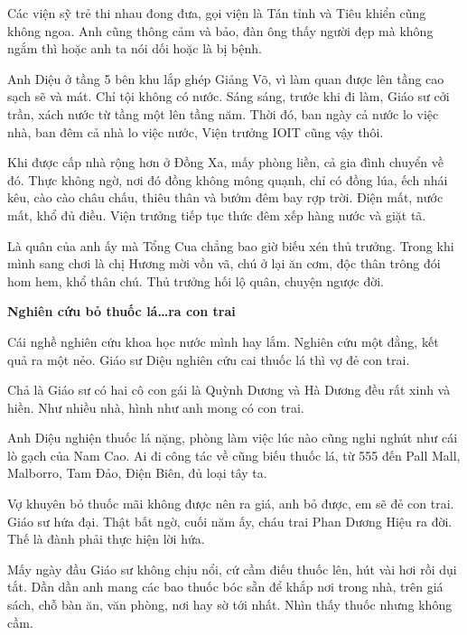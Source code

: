 Các viện sỹ trẻ thi nhau đong đưa, gọi viện là Tán tỉnh và Tiêu khiển cũng không ngoa. Anh cũng thông cảm và bảo, đàn ông thấy người đẹp mà không ngắm thì hoặc anh ta nói dối hoặc là bị bệnh.

Anh Diệu ở tầng 5 bên khu lắp ghép Giảng Võ, vì làm quan được lên tầng cao sạch sẽ và mát. Chỉ tội không có nước. Sáng sáng, trước khi đi làm, Giáo sư cởi trần, xách nước từ tầng một lên tầng năm. Thời đó, ban ngày cả nước lo việc nhà, ban đêm cả nhà lo việc nước, Viện trưởng IOIT cũng vậy thôi.

Khi được cấp nhà rộng hơn ở Đồng Xa, mấy phòng liền, cả gia đình chuyển về đó. Thực không ngờ, nơi đó đồng không mông quạnh, chỉ có đồng lúa, ếch nhái kêu, cào cào châu chấu, thiêu thân và bướm đêm bay rợp trời. Điện mất, nước mất, khổ đủ điều. Viện trưởng tiếp tục thức đêm xếp hàng nước và giặt tã.

Là quân của anh ấy mà Tổng Cua chẳng bao giờ biếu xén thủ trưởng. Trong khi mình sang chơi là chị Hương mời vồn vã, chú ở lại ăn cơm, độc thân trông đói hom hem, khổ thân chú. Thủ trưởng hối lộ quân, chuyện ngược đời.

\begin{center}
\textbf{Nghiên cứu bỏ thuốc lá…ra con trai}
\end{center}

Cái nghề nghiên cứu khoa học nước mình hay lắm. Nghiên cứu một đằng, kết quả ra một nẻo. Giáo sư Diệu nghiên cứu cai thuốc lá thì vợ đẻ con trai.

Chả là Giáo sư có hai cô con gái là Quỳnh Dương và Hà Dương đều rất xinh và hiền. Như nhiều nhà, hình như anh mong có con trai.


Anh Diệu nghiện thuốc lá nặng, phòng làm việc lúc nào cũng nghi nghút như cái lò gạch của Nam Cao. Ai đi công tác về cũng biếu thuốc lá, từ 555 đến Pall Mall, Malborro, Tam Đảo, Điện Biên, đủ loại tây ta.

Vợ khuyên bỏ thuốc mãi không được nên ra giá, anh bỏ được, em sẽ đẻ con trai. Giáo sư hứa đại. Thật bất ngờ, cuối năm ấy, cháu trai Phan Dương Hiệu ra đời. Thế là đành phải thực hiện lời hứa. 

Mấy ngày đầu Giáo sư không chịu nổi, cứ cầm điếu thuốc lên, hút vài hơi rồi dụi tắt. Dần dần anh mang các bao thuốc bóc sẵn để khắp nơi trong nhà, trên giá sách, chỗ bàn ăn, văn phòng, nơi hay sờ tới nhất. Nhìn thấy thuốc nhưng không cầm.

